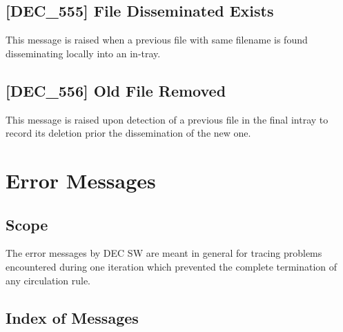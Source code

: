 \documentclass[dec_sum_main.tex]{subfiles}
\begin{document}
\label{DEC555}
\subsection{[DEC\_555] File Disseminated Exists}
This message is raised when a previous file with same filename is found disseminating locally into an in-tray.

\label{DEC556}
\subsection{[DEC\_556] Old File Removed}
This message is raised upon detection of a previous file in the final intray to record its deletion prior the dissemination of the new one.


\newpage
\section{Error Messages}

\subsection{Scope}
The error messages by DEC SW are meant in general for tracing problems encountered during one iteration which prevented the complete termination of any circulation rule.

\subsection{Index of Messages}
\end{document}
